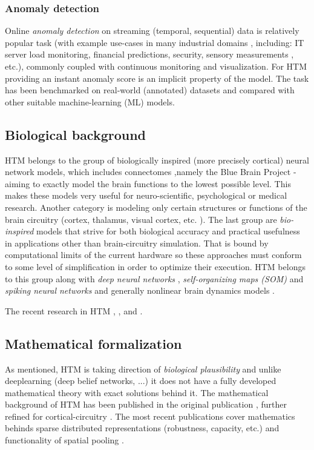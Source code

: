 \documentclass[a4,IEEEconf]{article}
\begin{document}
\subsubsection{Anomaly detection}
Online \textit{anomaly detection} \cite{journals/tissec/LaneB99} on streaming (temporal, sequential) data is relatively popular task (with example use-cases in many industrial domains \cite{conf/bigdataconf/RettigKCP15}, including: IT server load monitoring, financial predictions, security, sensory measurements \cite{journals/corr/abs-0810-5157}, etc.), commonly coupled with continuous monitoring and visualization. For HTM providing an instant anomaly score is an implicit property of the model. 
The task has been benchmarked \cite{journals/corr/LavinA15} on real-world (annotated) datasets and compared with other suitable machine-learning (ML) models. 
 
\subsection{Biological background}
HTM belongs to the group of biologically inspired (more precisely cortical) neural network models, which includes connectomes \cite{journals/scholarpedia/Sporns10},namely the Blue Brain Project \cite{markram_blue_2006} - aiming to exactly model the brain functions to the lowest possible level. This makes these models very useful for neuro-scientific, psychological or medical research. Another category is modeling only certain structures or functions of the brain circuitry (cortex, thalamus, visual cortex, etc. \cite{ccortex99-13}). The last group are \textit{bio-inspired} models that strive for both biological accuracy and practical usefulness in applications other than brain-circuitry simulation. That is bound by computational limits of the current hardware so these approaches must conform to some level of simplification in order to optimize their execution. HTM belongs to this group along with \textit{deep neural networks} \cite{1601.06116v1},  \textit{self-organizing maps (SOM)} \cite{journals/ni/BednarKM04} and \textit{spiking neural networks} \cite{Izhikevich2004} and generally nonlinear brain dynamics models \cite{q-bio/0507014v1}. 

The recent research in HTM \cite{conf/ijcnn/KnellerT15}, \cite{journals/jips/Kang15}, \cite{journals/corr/Ferrier14} and \cite{journals/corr/Byrne15a}. 

\subsection{Mathematical formalization}
As mentioned, HTM is taking direction of \textit{biological plausibility} and unlike deeplearning \cite{journals/nn/Schmidhuber15} (deep belief networks, ...) it does not have a fully developed mathematical theory with exact solutions \cite{journals/corr/SaxeMG13} behind it. The mathematical background of HTM has been published in the original publication \cite{HawkinsAndGeorge2006}, further refined for cortical-circuitry \cite{pmid19816557}. The most recent publications cover mathematics behinds sparse distributed representations (robustness, capacity, etc.) \cite{journals/corr/AhmadH15} and functionality of spatial pooling \cite{1601.06116v1}. 
\end{document}
